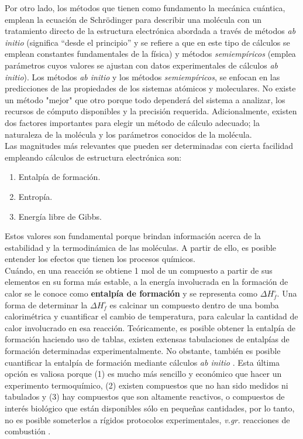 \documentclass[12pt]{article}
\begin{document}
Por otro lado, los métodos que tienen como fundamento la mecánica cuántica, emplean la ecuación de Schrödinger para describir una molécula con un tratamiento directo de la estructura electrónica abordada a través de métodos \textit{ab initio} (significa “desde el principio” y se refiere a que en este tipo de cálculos se emplean constantes fundamentales de la física) y métodos  \textit{semiempíricos} (emplea parámetros cuyos valores se ajustan con datos experimentales de cálculos \textit{ab initio}). Los métodos \textit{ab initio} y los métodos \textit{semiempíricos}, se enfocan en las predicciones de las propiedades de los sistemas atómicos y moleculares. No existe un método "mejor" que otro porque todo dependerá del sistema a analizar, los recursos de cómputo disponibles y la precisión requerida. Adicionalmente, existen dos factores importantes para elegir un método de cálculo adecuado; la naturaleza de la molécula y los parámetros conocidos de la molécula\cite{Cuevas2003}. \\

Las magnitudes más relevantes que pueden ser determinadas con cierta facilidad empleando cálculos de estructura electrónica son:

\begin{enumerate}
\item Entalpía de formación.
\item Entropía.
\item Energía libre de Gibbs.
\end{enumerate}

Estos valores son fundamental porque brindan información acerca de la estabilidad y la termodinámica de las moléculas. A partir de ello, es posible entender los efectos que tienen los procesos químicos. \\ 

Cuándo, en una reacción se obtiene 1 mol de un compuesto a partir de sus elementos en su forma más estable, a la energía involucrada en la formación de calor se le conoce como \textbf{entalpía de formación} y se representa como $\Delta H_{f}^{\circ}$. Una forma de determinar la $\Delta H_{f}^{\circ}$ es calcinar un compuesto dentro de una bomba calorimétrica y cuantificar el cambio de temperatura, para calcular la cantidad de calor involucrado en esa reacción. Teóricamente, es posible obtener la entalpía de formación haciendo uso de tablas, existen extensas tabulaciones de entalpías de formación determinadas experimentalmente\cite{NIST1998, Tajti2004}. No obstante, también es posible cuantificar la entalpía de formación mediante cálculos \textit{ab initio} \cite{Lewars2016}. Esta última opción es valiosa porque (1) es mucho más sencillo y económico que hacer un experimento termoquímico, (2) existen compuestos que no han sido medidos ni tabulados y (3) hay compuestos que son altamente reactivos, o compuestos de interés biológico que están disponibles sólo en pequeñas cantidades, por lo tanto, no es posible someterlos a rígidos protocolos experimentales, \textit{v.gr.} reacciones de combustión \cite{Lewars2016}.
\end{document}
